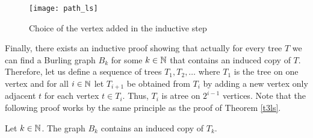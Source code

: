 \begin{figure}[ht]
\begin{center}
\texttt{[image: path\_ls]}
\end{center}
\caption{Choice of the vertex added in the inductive step}
\label{f3ls}
\end{figure}

Finally, there exists an inductive proof showing that actually for every tree $T$ we can find a Burling graph $B_k$ for some $k\in\mathbb{N}$ that contains an induced copy of $T$. Therefore, let us define a sequence of trees $T_1, T_2, \dots$ where $T_1$ is the tree on one vertex and for all $i\in\mathbb{N}$ let $T_{i+1}$ be obtained from $T_i$ by adding a new vertex only adjacent $t$ for each vertex $t\in T_i$. Thus, $T_i$ is atree on $2^{i-1}$ vertices. Note that the following proof works by the same principle as the proof of Theorem \ref{t3ls}.

\begin{thm}\label{t1ls}
Let $k\in\mathbb{N}$. The graph $B_k$ contains an induced copy of $T_k$.
\end{thm}


